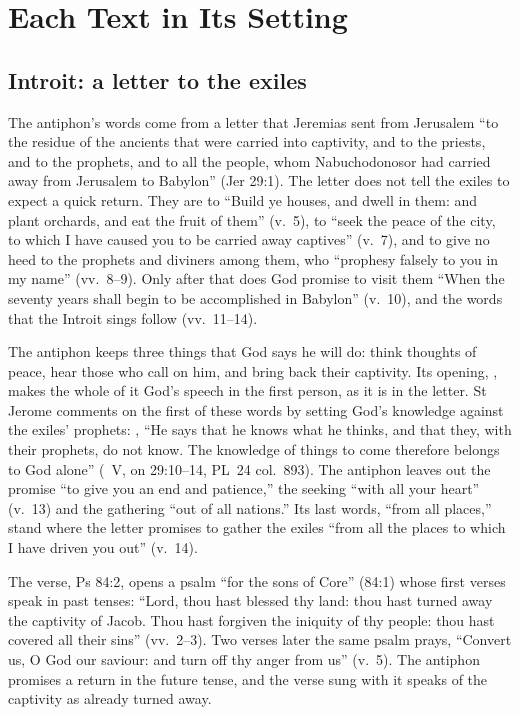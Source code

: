 \section{Each Text in Its Setting}
\label{sec:each-element}

\subsection{Introit: a letter to the exiles}
\label{sec:element-introit}

The antiphon's words come from a letter that Jeremias sent from Jerusalem
``to the residue of the ancients that were carried into captivity, and to the
priests, and to the prophets, and to all the people, whom Nabuchodonosor had
carried away from Jerusalem to Babylon'' (Jer 29:1). The letter does not tell
the exiles to expect a quick return. They are to ``Build ye houses, and dwell
in them: and plant orchards, and eat the fruit of them'' (v.~5), to ``seek the
peace of the city, to which I have caused you to be carried away captives''
(v.~7), and to give no heed to the prophets and diviners among them, who
``prophesy falsely to you in my name'' (vv.~8--9). Only after that does God
promise to visit them ``When the seventy years shall begin to be accomplished
in Babylon'' (v.~10), and the words that the Introit sings follow
(vv.~11--14).

The antiphon keeps three things that God says he will do: think thoughts of
peace, hear those who call on him, and bring back their captivity. Its
opening, , makes the whole of it God's speech in the first
person, as it is in the letter. St Jerome comments on the first of these words
by setting God's knowledge against the exiles' prophets: , ``He says that he knows what he thinks, and that
they, with their prophets, do not know. The knowledge of things to come
therefore belongs to God alone'' (~V, on 29:10--14, PL~24
col.~893). The antiphon leaves out the promise ``to give you an end and
patience,'' the seeking ``with all your heart'' (v.~13) and the gathering
``out of all nations.'' Its last words, ``from all places,'' stand where the
letter promises to gather the exiles ``from all the places to which I have
driven you out'' (v.~14).

The verse, Ps 84:2, opens a psalm ``for the sons of Core'' (84:1) whose first
verses speak in past tenses: ``Lord, thou hast blessed thy land: thou hast
turned away the captivity of Jacob. Thou hast forgiven the iniquity of thy
people: thou hast covered all their sins'' (vv.~2--3). Two verses later the
same psalm prays, ``Convert us, O God our saviour: and turn off thy anger from
us'' (v.~5). The antiphon promises a return in the future tense, and the verse
sung with it speaks of the captivity as already turned away.

